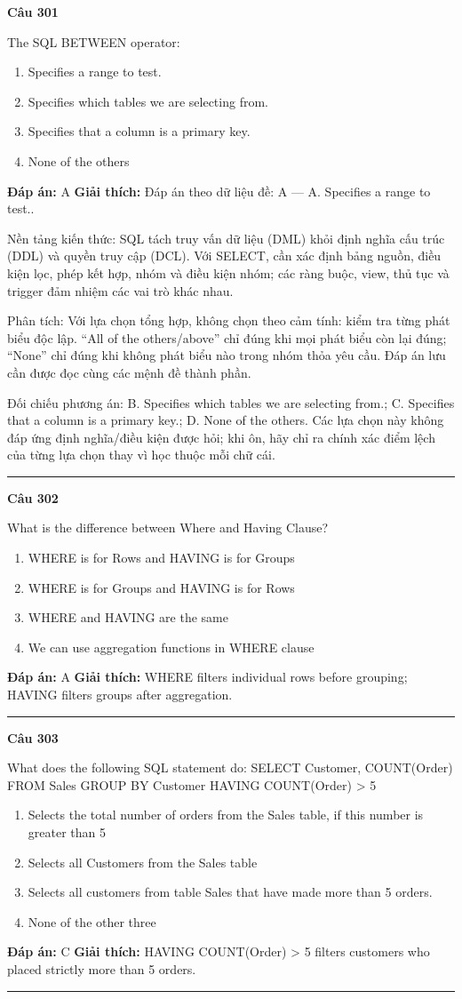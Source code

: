 \documentclass[11pt,a4paper]{article}
\newenvironment{question}[1]{%
  \par\vspace{1em}\noindent\textbf{\large Câu #1}\par\vspace{0.4em}
}{%
  \par\vspace{1em}\hrule\vspace{0.6em}
}
\newenvironment{choices}{%
  \begin{enumerate}[label=\textbf{\Alph*.},leftmargin=2.2em,itemsep=2pt,topsep=3pt]
}{%
  \end{enumerate}
}
\newcommand{\choice}{\item}
\begin{document}
\begin{question}{301}
The SQL BETWEEN operator:
\begin{choices}
\choice Specifies a range to test.
\choice Specifies which tables we are selecting from.
\choice Specifies that a column is a primary key.
\choice None of the others
\end{choices}
\textbf{Đáp án:} A
\textbf{Giải thích:} Đáp án theo dữ liệu đề: A — A. Specifies a range to test..

Nền tảng kiến thức: SQL tách truy vấn dữ liệu (DML) khỏi định nghĩa cấu trúc (DDL) và quyền truy cập (DCL). Với SELECT, cần xác định bảng nguồn, điều kiện lọc, phép kết hợp, nhóm và điều kiện nhóm; các ràng buộc, view, thủ tục và trigger đảm nhiệm các vai trò khác nhau.

Phân tích: Với lựa chọn tổng hợp, không chọn theo cảm tính: kiểm tra từng phát biểu độc lập. “All of the others/above” chỉ đúng khi mọi phát biểu còn lại đúng; “None” chỉ đúng khi không phát biểu nào trong nhóm thỏa yêu cầu. Đáp án lưu cần được đọc cùng các mệnh đề thành phần.

Đối chiếu phương án: B. Specifies which tables we are selecting from.; C. Specifies that a column is a primary key.; D. None of the others. Các lựa chọn này không đáp ứng định nghĩa/điều kiện được hỏi; khi ôn, hãy chỉ ra chính xác điểm lệch của từng lựa chọn thay vì học thuộc mỗi chữ cái.
\end{question}

\begin{question}{302}
What is the difference between Where and Having Clause?
\begin{choices}
\choice WHERE is for Rows and HAVING is for Groups
\choice WHERE is for Groups and HAVING is for Rows
\choice WHERE and HAVING are the same
\choice We can use aggregation functions in WHERE clause
\end{choices}
\textbf{Đáp án:} A
\textbf{Giải thích:} WHERE filters individual rows before grouping; HAVING filters groups after aggregation.
\end{question}

\begin{question}{303}
What does the following SQL statement do:
SELECT Customer, COUNT(Order)
FROM Sales
GROUP BY Customer
HAVING COUNT(Order) > 5
\begin{choices}
\choice Selects the total number of orders from the Sales table, if this number is greater than 5
\choice Selects all Customers from the Sales table
\choice Selects all customers from table Sales that have made more than 5 orders.
\choice None of the other three
\end{choices}
\textbf{Đáp án:} C
\textbf{Giải thích:} HAVING COUNT(Order) > 5 filters customers who placed strictly more than 5 orders.
\end{question}
\end{document}
